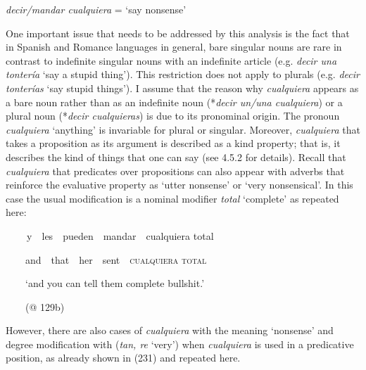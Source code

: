 \begin{styleStandard}
\textit{decir/mandar cualquiera} = ‘say nonsense’
\end{styleStandard}

\begin{styleStandard}
One important issue that needs to be addressed by this analysis is the fact that in Spanish and Romance languages in general, bare singular nouns are rare in contrast to indefinite singular nouns with an indefinite article (e.g. \textit{decir una tontería} ‘say a stupid thing’). This restriction does not apply to plurals (e.g. \textit{decir tonterías }‘say stupid things’). I assume that the reason why \textit{cualquiera} appears as a bare noun rather than as an indefinite noun (*\textit{decir un/una cualquiera}) or a plural noun (*\textit{decir cualquieras}) is due to its pronominal origin. The pronoun \textit{cualquiera} ‘anything’ is invariable for plural or singular. Moreover, \textit{cualquiera} that takes a proposition as its argument is described as a kind property; that is, it describes the kind of things that one can say (see 4.5.2 for details). Recall that \textit{cualquiera} that predicates over propositions can also appear with adverbs that reinforce the evaluative property as ‘utter nonsense’ or ‘very nonsensical’. In this case the usual modification is a nominal modifier \textit{total} ‘complete’ as repeated here:
\end{styleStandard}

\begin{styleStandard}
\textbf{\ \ }\ \ y\ \ les\ \ pueden\ \ mandar\ \ cualquiera total\ \ 
\end{styleStandard}

\begin{styleStandard}
\ \ \ \ and\ \ that\ \ her\ \ sent\ \ \textsc{cualquiera total}
\end{styleStandard}

\begin{styleStandard}
\ \ \ \ ‘and you can tell them complete bullshit.’
\end{styleStandard}

\begin{styleStandard}
\ \ \ \ (@ 129b)
\end{styleStandard}

\begin{styleStandard}
However, there are also cases of \textit{cualquiera} with the meaning ‘nonsense’ and degree modification with (\textit{tan, re} ‘very’) when \textit{cualquiera} is used in a predicative position, as already shown in (231) and repeated here.
\end{styleStandard}

